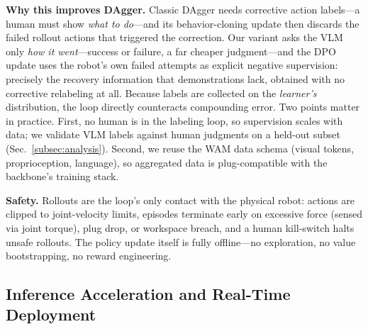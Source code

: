 \documentclass[letterpaper, 10pt, conference]{ieeeconf}
\begin{document}
\textbf{Why this improves DAgger.} Classic DAgger needs corrective action labels---a human must show \emph{what to do}---and its behavior-cloning update then discards the failed rollout actions that triggered the correction. Our variant asks the VLM only \emph{how it went}---success or failure, a far cheaper judgment---and the DPO update uses the robot's own failed attempts as explicit negative supervision: precisely the recovery information that demonstrations lack, obtained with no corrective relabeling at all. Because labels are collected on the \emph{learner's} distribution, the loop directly counteracts compounding error. Two points matter in practice. First, no human is in the labeling loop, so supervision scales with data; we validate VLM labels against human judgments on a held-out subset (Sec.~\ref{subsec:analysis}). Second, we reuse the WAM data schema (visual tokens, proprioception, language), so aggregated data is plug-compatible with the backbone's training stack.

\textbf{Safety.} Rollouts are the loop's only contact with the physical robot: actions are clipped to joint-velocity limits, episodes terminate early on excessive force (sensed via joint torque), plug drop, or workspace breach, and a human kill-switch halts unsafe rollouts. The policy update itself is fully offline---no exploration, no value bootstrapping, no reward engineering.

\subsection{Inference Acceleration and Real-Time Deployment}
\label{subsec:accel}
\end{document}
